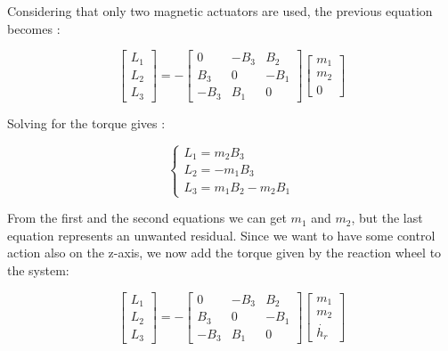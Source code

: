 \documentclass[11pt,a4paper]{report}
\begin{document}
Considering that only two magnetic actuators are used, the previous equation becomes : 

\begin{equation}
 \begin{bmatrix}
    L_1\\
    L_2\\
    L_3 
 \end{bmatrix}
= - 
 \begin{bmatrix}
    0 & -B_{3} & B_{2} \\
    B_{3} & 0 & -B_{1} \\
   -B_{3} & B_{1} & 0
 \end{bmatrix} 
 \begin{bmatrix}
    m_{1}\\
    m_{2}\\
    0
 \end{bmatrix}  
\end{equation}

Solving for the torque gives : 

\begin{equation}
 \begin{cases} L_1 = m_{2}B_{3}\\ L_2 = -m_{1}B_{3} \\ L_3 = m_{1}B_{2} - m_{2}B_{1} \end{cases}
\end{equation}

From the first and the second equations we can get $m_{1}$ and $m_2$, but the last equation represents an unwanted residual. Since we want to have some control action also on the z-axis, we now add the torque given by the reaction wheel to the system: 

\begin{equation}
 \begin{bmatrix}
    L_1\\
    L_2\\
    L_3
 \end{bmatrix}
= - 
 \begin{bmatrix}
    0 & -B_{3} & B_{2} \\
    B_{3} & 0 & -B_{1} \\
   -B_{3} & B_{1} & 0
 \end{bmatrix} 
 \begin{bmatrix}
    m_{1}\\
    m_{2}\\
    \dot{h_{r}}
 \end{bmatrix}  
\end{equation}
\end{document}
